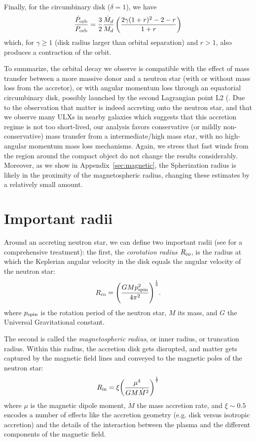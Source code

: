 \documentclass[twocolumn]{aastex631}
\newcommand{\pspin}{\ensuremath{p_{\rm spin}}}
\newcommand{\Porbdot}{\ensuremath{\dot{P}_{\rm orb}}}
\newcommand{\Porb}{\ensuremath{P_{\rm orb}}}
\newcommand{\Mdot}{\ensuremath{\dot{M}}}
\newcommand{\rin}{\ensuremath{R_{\rm in}}}
\newcommand{\rco}{\ensuremath{R_{\rm co}}}
\begin{document}
Finally, for the circumbinary disk ($\delta=1$), we have
\begin{equation}\label{eq:delta}
\frac{\Porbdot}{\Porb} = \frac{3}{2}\frac{\Mdot_d}{M_d}\left(\frac{2\gamma(1 + r)^2 - 2 - r}{1+r}\right)
\end{equation}
which, for $\gamma\geq1$ (disk radius larger than orbital separation) and $r>1$, also produces a contraction of the orbit.

To summarize, the orbital decay we observe is compatible with the effect of mass transfer between a more massive donor and a neutron star (with or without mass loss from the accretor), or with angular momentum loss through an equatorial circumbinary disk, possibly launched by the second Lagrangian point L2 (\citealt{taurisFormationEvolutionCompact2006}.
Due to the observation that matter is indeed accreting onto the neutron star, and that we observe many ULXs in nearby galaxies which suggests that this accretion regime is not too short-lived, our analysis favors conservative (or mildly non-conservative) mass transfer from a intermediate/high mass star, with no high-angular momentum mass loss mechanisms.
Again, we stress that fast winds from the region around the compact object do not change the results considerably.
Moreover, as we show in Appendix~\ref{sec:magnetic}, the Spherization radius is likely in the proximity of the magnetospheric radius, changing these estimates by a relatively small amount.

\section{Important radii}\label{sec:radii}
Around an accreting neutron star, we can define two important radii (see \citealt{frankAccretionPowerAstrophysics2002} for a comprehensive treatment): the first, the \textit{corotation radius} $\rco$, is the radius at which the Keplerian angular velocity in the disk equals the angular velocity of the neutron star:
\begin{equation}\label{eq:rco}
    \rco = {\left(
    \frac{GM \pspin^2}{4\pi^2}
    \right)}^{\frac{1}{3}}.
\end{equation}
where $\pspin$ is the rotation period of the neutron star, $M$ its mass, and $G$ the Universal Gravitational constant.

The second is called the \textit{magnetospheric radius}, or inner radius, or truncation radius.
Within this radius, the accretion disk gets disrupted, and matter gets captured by the magnetic field lines and conveyed to the magnetic poles of the neutron star:
\begin{equation}\label{eq:rmag}
    \rin = \xi {\left(\frac{\mu^4}{GM\dot{M}^2}\right)}^{\frac{1}{7}}
\end{equation}
where $\mu$ is the magnetic dipole moment, $\Mdot$ the mass accretion rate, and $\xi\sim0.5$ encodes a number of effects like the accretion geometry (e.g. disk versus isotropic accretion) and the details of the interaction between the plasma and the different components of the magnetic field.
\end{document}
